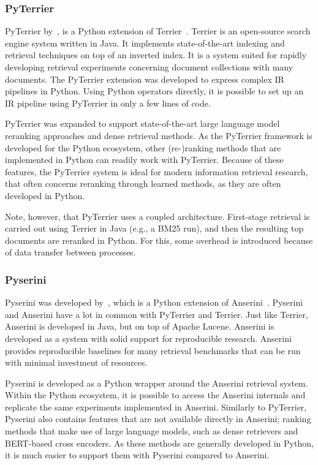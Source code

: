 \subsubsection{PyTerrier}
PyTerrier by~\citet{pyterrier}, is a Python extension of Terrier~\citep{terrier}. Terrier is an open-source search engine system written in Java. It implements state-of-the-art indexing and retrieval techniques on top of an inverted index. It is a system suited for rapidly developing retrieval experiments concerning document collections with many documents. 
The PyTerrier extension was developed to express complex IR pipelines in Python. Using Python operators directly, it is possible to set up an IR pipeline using PyTerrier in only a few lines of code. 

PyTerrier was expanded to support state-of-the-art large language model reranking approaches and dense retrieval methods. As the PyTerrier framework is developed for the Python ecosystem, other (re-)ranking methods that are implemented in Python can readily work with PyTerrier. Because of these features, the PyTerrier system is ideal for modern information retrieval research, that often concerns reranking through learned methods, as they are often developed in Python.

Note, however, that PyTerrier uses a coupled architecture. First-stage retrieval is carried out using Terrier in Java (e.g., a BM25 run), and then the resulting top documents are reranked in Python. For this, some overhead is introduced because of data transfer between processes. 

\subsubsection{Pyserini}
Pyserini was developed by~\citet{pyserini}, which is a Python extension of Anserini~\citep{anserini}. Pyserini and Anserini have a lot in common with PyTerrier and Terrier. Just like Terrier, Anserini is developed in Java, but on top of Apache Lucene. Anserini is developed as a system with solid support for reproducible research. Anserini provides reproducible baselines for many retrieval benchmarks that can be run with minimal investment of resources. 

Pyserini is developed as a Python wrapper around the Anserini retrieval system. Within the Python ecosystem, it is possible to access the Anserini internals and replicate the same experiments implemented in Anserini. Similarly to PyTerrier, Pyserini also contains features that are not available directly in Anserini; ranking methods that make use of large language models, such as dense retrievers and BERT-based cross encoders. As these methods are generally developed in Python, it is much easier to support them with Pyserini compared to Anserini.

